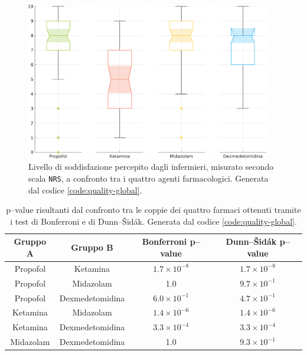 \begin{figure}[ht]
    \centering
    \includegraphics[width=0.95\textwidth]{Figure/qualita-colorful.png}
    \caption{Livello di soddisfazione percepito dagli infermieri, misurato secondo scala \texttt{NRS}, a confronto tra i quattro agenti farmacologici. Generata dal codice \ref{code:quality-global}.}
    \label{fig:qualitascolorful}
\end{figure}

\vfill

\newpage

\bgroup
\def\arraystretch{1.5}
\begin{table}[t]
    \centering
    \begin{tabular}{c|c|c|c}
         Gruppo A & Gruppo B & Bonferroni p--value & Dunn--Šidák p--value\\ \hline
       Propofol & Ketamina & $1.7\times10^{-8}$ & $1.7\times10^{-8}$ \\
       Propofol & Midazolam  & 1.0 & $9.7 \times 10^{-1}$\\
       Propofol & Dexmedetomidina & $6.0 \times 10^{-1}$ & $4.7 \times 10^{-1}$\\
       Ketamina & Midazolam & $1.4\times10^{-6}$ & $1.4\times10^{-6}$\\
       Ketamina & Dexmedetomidina & $3.3\times10^{-4}$ & $3.3\times10^{-4}$\\
       Midazolam & Dexmedetomidina & 1.0 & $9.3 \times 10^{-1}$\\
       
    \end{tabular}
    \caption{p--value risultanti dal confronto tra le coppie dei quattro farmaci ottenuti tramite i test di Bonferroni e di Dunn--Šidák. Generata dal codice \ref{code:quality-global}.}
    \label{tab:qualitatest}
\end{table}
\egroup

